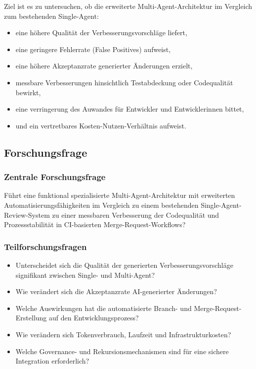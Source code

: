 Ziel ist es zu untersuchen, ob die erweiterte Multi-Agent-Architektur im Vergleich zum bestehenden Single-Agent:

\begin{itemize}
	\item eine höhere Qualität der Verbesserungsvorschläge liefert,
	\item eine geringere Fehlerrate (False Positives) aufweist,
	\item eine höhere Akzeptanzrate generierter Änderungen erzielt,
	\item messbare Verbesserungen hinsichtlich Testabdeckung oder Codequalität bewirkt,
    \item eine verringerung des Auwandes für Entwickler und Entwicklerinnen bittet,
	\item und ein vertretbares Kosten-Nutzen-Verhältnis aufweist.
\end{itemize}



\subsection{Forschungsfrage}

\subsubsection{Zentrale Forschungsfrage}

Führt eine funktional spezialisierte Multi-Agent-Architektur mit erweiterten Automatisierungsfähigkeiten im Vergleich zu einem bestehenden Single-Agent-Review-System zu einer messbaren Verbesserung der Codequalität und Prozessstabilität in CI-basierten Merge-Request-Workflows?

\subsubsection{Teilforschungsfragen}

\begin{itemize}
	\item Unterscheidet sich die Qualität der generierten Verbesserungsvorschläge signifikant zwischen Single- und Multi-Agent?
	\item Wie verändert sich die Akzeptanzrate AI-generierter Änderungen?
	\item Welche Auswirkungen hat die automatisierte Branch- und Merge-Request-Erstellung auf den Entwicklungsprozess?
	\item Wie verändern sich Tokenverbrauch, Laufzeit und Infrastrukturkosten?
	\item Welche Governance- und Rekursionsmechanismen sind für eine sichere Integration erforderlich?
\end{itemize}



